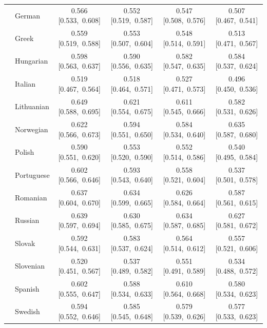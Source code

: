\begin{longtable}[t]{llcccc}
 & German & 0.566 [0.533,~0.608] & 0.552 [0.519,~0.587] & 0.547 [0.508,~0.576] & 0.507 [0.467,~0.541]\\

 & Greek & 0.559 [0.519,~0.588] & 0.553 [0.507,~0.604] & 0.548 [0.514,~0.591] & 0.513 [0.471,~0.567]\\

 & Hungarian & 0.598 [0.563,~0.637] & 0.590 [0.556,~0.635] & 0.582 [0.547,~0.635] & 0.584 [0.537,~0.624]\\

 & Italian & 0.519 [0.467,~0.564] & 0.518 [0.464,~0.571] & 0.527 [0.471,~0.573] & 0.496 [0.450,~0.536]\\

 & Lithuanian & 0.649 [0.588,~0.695] & 0.621 [0.554,~0.675] & 0.611 [0.545,~0.666] & 0.582 [0.531,~0.626]\\

 & Norwegian & 0.622 [0.566,~0.673] & 0.594 [0.551,~0.650] & 0.584 [0.534,~0.640] & 0.635 [0.587,~0.680]\\

 & Polish & 0.590 [0.551,~0.620] & 0.553 [0.520,~0.590] & 0.552 [0.514,~0.586] & 0.540 [0.495,~0.584]\\

 & Portuguese & 0.602 [0.566,~0.646] & 0.593 [0.543,~0.640] & 0.558 [0.521,~0.604] & 0.537 [0.501,~0.578]\\

 & Romanian & 0.637 [0.604,~0.670] & 0.634 [0.599,~0.665] & 0.626 [0.584,~0.664] & 0.587 [0.561,~0.615]\\

 & Russian & 0.639 [0.597,~0.694] & 0.630 [0.585,~0.675] & 0.634 [0.587,~0.685] & 0.627 [0.581,~0.672]\\

 & Slovak & 0.592 [0.544,~0.631] & 0.583 [0.537,~0.624] & 0.564 [0.514,~0.612] & 0.557 [0.521,~0.606]\\

 & Slovenian & 0.520 [0.451,~0.567] & 0.537 [0.489,~0.582] & 0.551 [0.491,~0.589] & 0.534 [0.488,~0.572]\\

 & Spanish & 0.602 [0.555,~0.647] & 0.588 [0.534,~0.633] & 0.610 [0.564,~0.668] & 0.580 [0.534,~0.623]\\

 & Swedish & 0.594 [0.552,~0.646] & 0.585 [0.545,~0.648] & 0.579 [0.539,~0.626] & 0.577 [0.533,~0.623]\\


\end{longtable}
